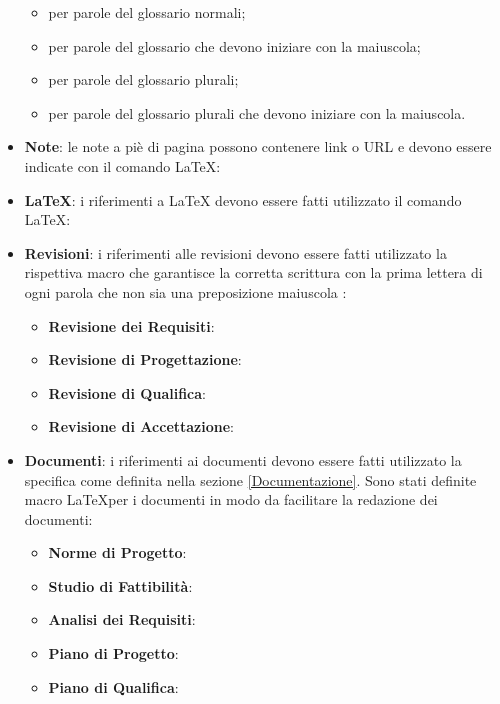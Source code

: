 \documentclass[12pt,a4paper]{article}
\begin{document}
\begin{itemize}
  \begin{itemize}
  	\item {} per parole del glossario normali;
	\item {} per parole del glossario che devono iniziare con la maiuscola;
	\item {} per parole del glossario plurali;
	\item {} per parole del glossario plurali che devono iniziare con la maiuscola.
	\end{itemize}
  \item \textbf{Note}: le note a piè di pagina possono contenere link o URL e devono essere indicate con il comando \LaTeX: 
  \item \textbf{\LaTeX}: i riferimenti a \LaTeX{} devono essere fatti utilizzato il comando \LaTeX: 
  \item \textbf{Revisioni}: i riferimenti alle revisioni devono essere fatti utilizzato la rispettiva macro che garantisce la corretta scrittura con la prima lettera di ogni parola che non sia una preposizione maiuscola :
  \begin{itemize}
    \item \textbf{Revisione dei Requisiti}: 
    \item \textbf{Revisione di Progettazione}: 
    \item \textbf{Revisione di Qualifica}: 
    \item \textbf{Revisione di Accettazione}: 
  \end{itemize}
  \item \textbf{Documenti}: i riferimenti ai documenti devono essere fatti utilizzato la specifica come definita nella sezione \ref{Documentazione}. Sono stati definite macro  \LaTeX per i documenti in modo da facilitare la redazione dei documenti:
  \begin{itemize}
    \item \textbf{Norme di Progetto}: 
    \item \textbf{Studio di Fattibilità}: 
    \item \textbf{Analisi dei Requisiti}: 
    \item \textbf{Piano di Progetto}: 
    \item \textbf{Piano di Qualifica}: 
  \end{itemize}
\end{itemize}
\end{document}
